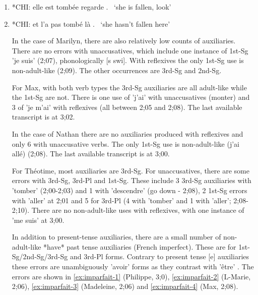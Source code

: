 \documentclass[
  12pt,
]{article}
\begin{document}
\begin{enumerate}[resume*]
\begin{enumerate}[resume*]
\begin{enumerate}[resume*]
\begin{enumerate}[resume*]
\begin{enumerate}[resume*]
  \item{*CHI:   elle est tombée regarde . \textipa{[Ele]}  \label{ex:leonard1}}\newline
  \     `she is fallen, look'
  \item{*CHI:   et l'a pas tombé là .  \textipa{[Ela]}  \label{ex:leonard2}}\newline
  \     `she hasn't fallen here'

In the case of Marilyn, there are also relatively low counts of auxiliaries. There are no errors with unaccusatives, which include one instance of 1st-Sg 'je suis' (2;07), phonologically [s swi]. With reflexives the only 1st-Sg use is non-adult-like (2;09). The other occurrences are 3rd-Sg and 2nd-Sg. 

For Max, with both verb types the 3rd-Sg auxiliaries are all adult-like while the 1st-Sg are not. There is one use of 'j'ai' with unaccusatives (monter) and 3 of 'je m'ai' with reflexives (all between 2;05 and 2;08). The last available transcript is at 3;02.

In the case of Nathan there are no auxiliaries produced with reflexives and only 6 with unaccusative verbs. The only 1st-Sg use is non-adult-like (j'ai allé) (2;08). The last available transcript is at 3;00. 

For Théotime, most auxiliaries are 3rd-Sg. For unaccusatives, there are some errors with 3rd-Sg, 3rd-Pl and 1st-Sg. These include 3 3rd-Sg auxiliaries with 'tomber' (2;00-2;03) and 1 with 'descendre' (go down - 2;08), 2 1st-Sg errors with 'aller' at 2;01 and 5 for 3rd-Pl (4 with 'tomber' and 1 with 'aller'; 2;08-2;10). There are no non-adult-like uses with reflexives, with one instance of 'me suis' at 3;00. 

In addition to present-tense auxiliaries, there are a small number of non-adult-like *have* past tense auxiliaries (French imperfect). These are \textipa{[avE]} for 1st-Sg/2nd-Sg/3rd-Sg and 3rd-Pl forms. Contrary to present tense [e] auxiliaries these errors are unambiguously 'avoir' forms as they contrast with 'être' \textipa{[etE]}. The errors are shown in \ref{ex:imparfait-1} (Philippe, 3;0),  \ref{ex:imparfait-2} (L-Marie, 2;06), \ref{ex:imparfait-3} (Madeleine, 2;06) and \ref{ex:imparfait-4} (Max, 2;08).  


\end{enumerate}
\end{enumerate}
\end{enumerate}
\end{enumerate}
\end{enumerate}
\end{document}
